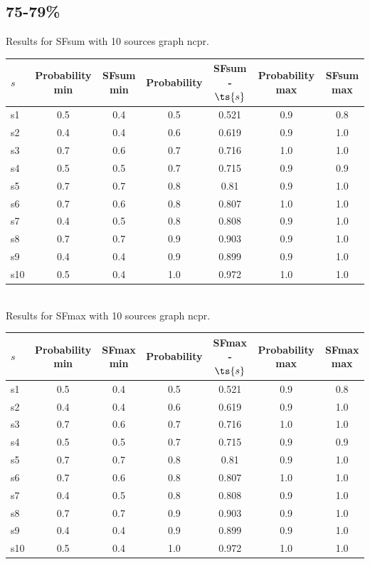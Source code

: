 \documentclass{article}
\begin{document}
\newpage

\subsection{75-79\%}

\noindent Results for SFsum with 10 sources graph ncpr.

\noindent\begin{tabular}{|l|c|c|c|c|c|c|}
\hline
$s$& Probability min & SFsum min & Probability & SFsum - $\ts{s}$ & Probability max & SFsum max\\
\hline
s1 &0.5 & 0.4 & 0.5 & 0.521 & 0.9 & 0.8\\
\hline
s2 &0.4 & 0.4 & 0.6 & 0.619 & 0.9 & 1.0\\
\hline
s3 &0.7 & 0.6 & 0.7 & 0.716 & 1.0 & 1.0\\
\hline
s4 &0.5 & 0.5 & 0.7 & 0.715 & 0.9 & 0.9\\
\hline
s5 &0.7 & 0.7 & 0.8 & 0.81 & 0.9 & 1.0\\
\hline
s6 &0.7 & 0.6 & 0.8 & 0.807 & 1.0 & 1.0\\
\hline
s7 &0.4 & 0.5 & 0.8 & 0.808 & 0.9 & 1.0\\
\hline
s8 &0.7 & 0.7 & 0.9 & 0.903 & 0.9 & 1.0\\
\hline
s9 &0.4 & 0.4 & 0.9 & 0.899 & 0.9 & 1.0\\
\hline
s10 &0.5 & 0.4 & 1.0 & 0.972 & 1.0 & 1.0\\
\hline
\end{tabular}\\

\noindent Results for SFmax with 10 sources graph ncpr.

\noindent\begin{tabular}{|l|c|c|c|c|c|c|}
\hline
$s$& Probability min & SFmax min & Probability & SFmax - $\ts{s}$ & Probability max & SFmax max\\
\hline
s1 &0.5 & 0.4 & 0.5 & 0.521 & 0.9 & 0.8\\
\hline
s2 &0.4 & 0.4 & 0.6 & 0.619 & 0.9 & 1.0\\
\hline
s3 &0.7 & 0.6 & 0.7 & 0.716 & 1.0 & 1.0\\
\hline
s4 &0.5 & 0.5 & 0.7 & 0.715 & 0.9 & 0.9\\
\hline
s5 &0.7 & 0.7 & 0.8 & 0.81 & 0.9 & 1.0\\
\hline
s6 &0.7 & 0.6 & 0.8 & 0.807 & 1.0 & 1.0\\
\hline
s7 &0.4 & 0.5 & 0.8 & 0.808 & 0.9 & 1.0\\
\hline
s8 &0.7 & 0.7 & 0.9 & 0.903 & 0.9 & 1.0\\
\hline
s9 &0.4 & 0.4 & 0.9 & 0.899 & 0.9 & 1.0\\
\hline
s10 &0.5 & 0.4 & 1.0 & 0.972 & 1.0 & 1.0\\
\hline
\end{tabular}\\
\end{document}
